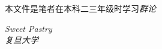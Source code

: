     本文件是笔者在本科二三年级时学习\emph{群论}

    \begin{flushright}
        \textit{Sweet Pastry} \\[1em]
        \textit{复旦大学}
    \end{flushright}